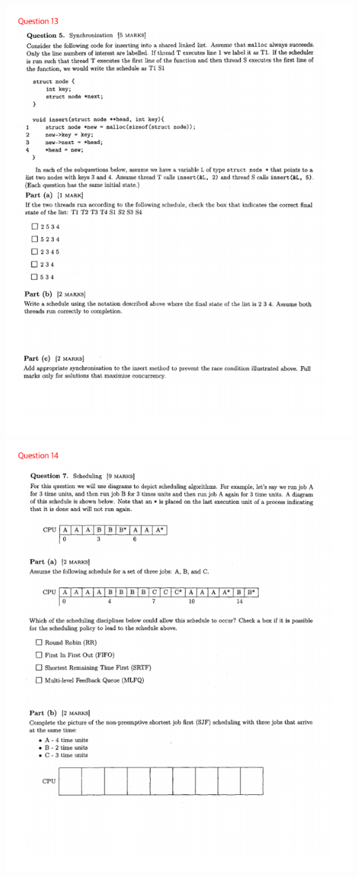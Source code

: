 \documentclass[12pt]{article}
\begin{document}
\begin{center}
    \includegraphics[width=\linewidth]{../../images/midterm_5_14.png}
    \includegraphics[width=\linewidth]{../../images/midterm_5_15.png}

\end{center}
\end{document}
